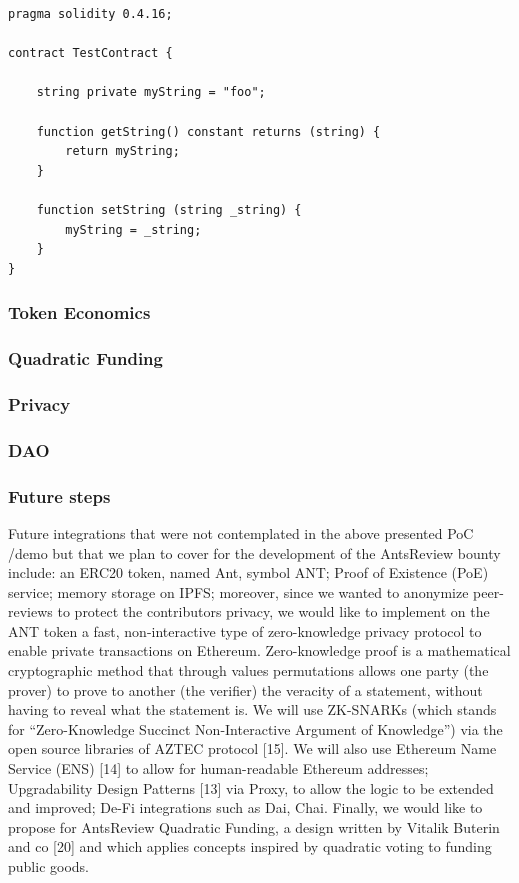\documentclass[runningheads]{llncs}
\begin{document}
\begin{lstlisting}[language=Solidity]
pragma solidity 0.4.16;

contract TestContract {

	string private myString = "foo";

	function getString() constant returns (string) {
	    return myString;
	}

	function setString (string _string) {
	    myString = _string;
	}
}
\end{lstlisting}

\subsubsection{Token Economics}

\subsubsection{Quadratic Funding}

\subsubsection{Privacy}

\subsubsection{DAO}


\subsubsection{Future steps}
Future integrations that were not contemplated in the above presented PoC /demo but that we plan to cover for the development of the AntsReview bounty include: an ERC20 token, named Ant,  symbol ANT; Proof of Existence (PoE) service; memory storage on IPFS; moreover, since we wanted to anonymize peer-reviews to protect the contributors privacy, we would like to implement on the ANT token a fast, non-interactive type of zero-knowledge privacy protocol to enable private transactions on Ethereum. Zero-knowledge proof is a mathematical cryptographic method that through values permutations allows one party (the prover) to prove to another (the verifier) the veracity of a statement, without having to reveal what the statement is. We will use ZK-SNARKs (which stands for “Zero-Knowledge Succinct Non-Interactive Argument of Knowledge”) via the open source libraries of AZTEC protocol [15]. We will also use Ethereum Name Service (ENS) [14] to allow for human-readable Ethereum addresses; Upgradability Design Patterns [13] via Proxy, to allow the logic to be extended and improved; De-Fi integrations such as Dai, Chai. Finally, we would like to propose for AntsReview Quadratic Funding, a design written by Vitalik Buterin and co [20] and which applies concepts inspired by quadratic voting to funding public goods.
\end{document}
